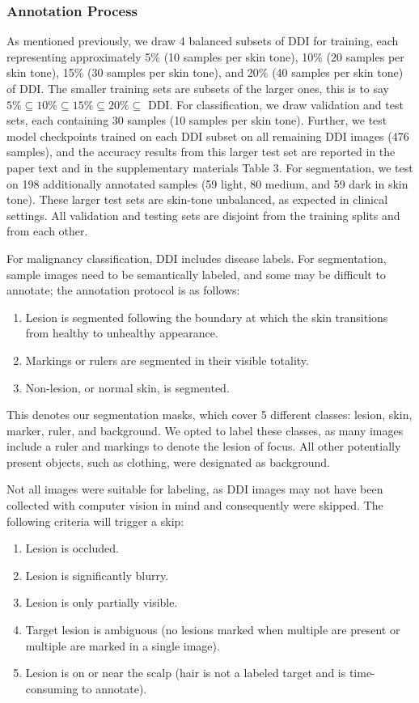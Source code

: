 \documentclass[11pt]{ucthesis}
\begin{document}
\subsubsection{Annotation Process}
As mentioned previously, we draw 4 balanced subsets of DDI for training, each representing approximately 5\% (10 samples per skin tone), 10\% (20 samples per skin tone), 15\% (30 samples per skin tone), and 20\% (40 samples per skin tone) of DDI. The smaller training sets are subsets of the larger ones, this is to say $5\% \subseteq 10\% \subseteq 15\% \subseteq 20\% \subseteq$ DDI. For classification, we draw validation and test sets, each containing 30 samples (10 samples per skin tone). Further, we test model checkpoints trained on each DDI subset on all remaining DDI images (476 samples), and the accuracy results from this larger test set are reported in the paper text and in the supplementary materials Table 3. For segmentation, we test on 198 additionally annotated samples (59 light, 80 medium, and 59 dark in skin tone). These larger test sets are skin-tone unbalanced, as expected in clinical settings. All validation and testing sets are disjoint from the training splits and from each other.

For malignancy classification, DDI includes disease labels. For segmentation, sample images need to be semantically labeled, and some may be difficult to annotate; the annotation protocol is as follows:

\begin{enumerate}
  \item Lesion is segmented following the boundary at which the skin transitions from healthy to unhealthy appearance.
  \item Markings or rulers are segmented in their visible totality.
  \item Non-lesion, or normal skin, is segmented.
\end{enumerate}

This denotes our segmentation masks, which cover 5 different classes: lesion, skin, marker, ruler, and background. We opted to label these classes, as many images include a ruler and markings to denote the lesion of focus. All other potentially present objects, such as clothing, were designated as background.

Not all images were suitable for labeling, as DDI images may not have been collected with computer vision in mind and consequently were skipped. The following criteria will trigger a skip: 

\begin{enumerate}
  \item Lesion is occluded.
  \item Lesion is significantly blurry.
  \item Lesion is only partially visible.
  \item Target lesion is ambiguous (no lesions marked when multiple are present or multiple are marked in a single image).
  \item Lesion is on or near the scalp (hair is not a labeled target and is time-consuming to annotate).
\end{enumerate}
\end{document}
